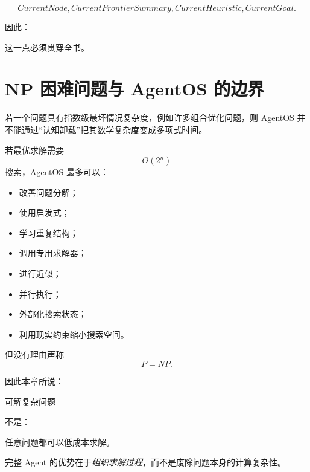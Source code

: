 \begin{equation}
CurrentNode,
CurrentFrontierSummary,
CurrentHeuristic,
CurrentGoal.
\end{equation}

因此：

\begin{statementbox}
\centering
{}
\end{statementbox}

这一点必须贯穿全书。

\section{NP 困难问题与 AgentOS 的边界}

若一个问题具有指数级最坏情况复杂度，例如许多组合优化问题，则 AgentOS 并不能通过“认知卸载”把其数学复杂度变成多项式时间。

若最优求解需要
\begin{equation}
O(2^n)
\end{equation}
搜索，AgentOS 最多可以：

\begin{itemize}
    \item 改善问题分解；
    \item 使用启发式；
    \item 学习重复结构；
    \item 调用专用求解器；
    \item 进行近似；
    \item 并行执行；
    \item 外部化搜索状态；
    \item 利用现实约束缩小搜索空间。
\end{itemize}

但没有理由声称
\begin{equation}
P=NP.
\end{equation}

因此本章所说：

\begin{statementbox}
可解复杂问题
\end{statementbox}

不是：

\begin{statementbox}
任意问题都可以低成本求解。
\end{statementbox}

完整 Agent 的优势在于\emph{组织求解过程}，而不是废除问题本身的计算复杂性。

